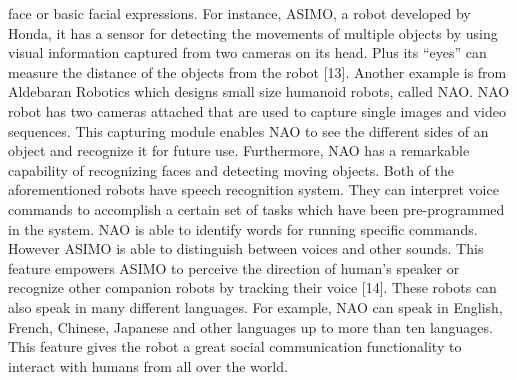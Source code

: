 face or basic facial expressions. For instance, ASIMO, a robot developed by Honda, it has
a sensor for detecting the movements of multiple objects by using visual information
captured from two cameras on its head. Plus its “eyes” can measure the distance of the
objects from the robot [13]. Another example is from Aldebaran Robotics which designs
small size humanoid robots, called NAO. NAO robot has two cameras attached that are
used to capture single images and video sequences. This capturing module enables NAO
to see the different sides of an object and recognize it for future use. Furthermore, NAO
has a remarkable capability of recognizing faces and detecting moving objects.
Both of the aforementioned robots have speech recognition system. They can interpret
voice commands to accomplish a certain set of tasks which have been pre-programmed in
the system. NAO is able to identify words for running specific commands. However
ASIMO is able to distinguish between voices and other sounds. This feature empowers
ASIMO to perceive the direction of human’s speaker or recognize other companion robots
by tracking their voice [14]. These robots can also speak in many different languages. For
example, NAO can speak in English, French, Chinese, Japanese and other languages up to
more than ten languages. This feature gives the robot a great social communication
functionality to interact with humans from all over the world.

